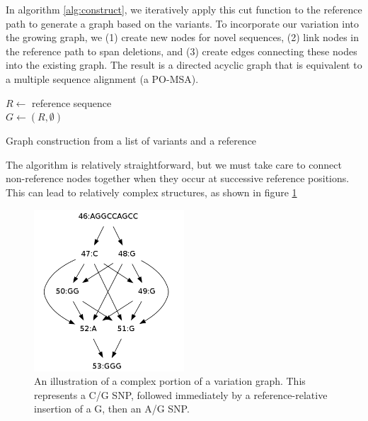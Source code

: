 \documentclass{article}
\begin{document}
In algorithm \ref{alg:construct}, we iteratively apply this cut function to the reference path to generate a graph based on the variants. To incorporate our variation into the growing graph, we (1) create new nodes for novel sequences, (2) link nodes in the reference path to span deletions, and (3) create edges connecting these nodes into the existing graph. The result is a directed acyclic graph that is equivalent to a multiple sequence alignment (a PO-MSA).

\begin{algorithm}[h!]
  $R \gets $ reference sequence \\
  $G \gets ( R, \emptyset )$ \\
  \caption{
\label{alg:construct}
Graph construction from a list of variants and a reference}
\end{algorithm}

The algorithm is relatively straightforward, but we must take care to connect non-reference nodes together when they occur at successive reference positions. This can lead to relatively complex structures, as shown in figure \ref{fig:complexjunction}

\begin{figure}[h!]
\centering
\includegraphics[width=0.5\textwidth]{figures/complexjunction}
\caption{\label{fig:complexjunction}
  An illustration of a complex portion of a variation graph. This represents a C/G SNP, followed immediately by a reference-relative insertion of a G, then an A/G SNP.
}
\end{figure}
\end{document}
